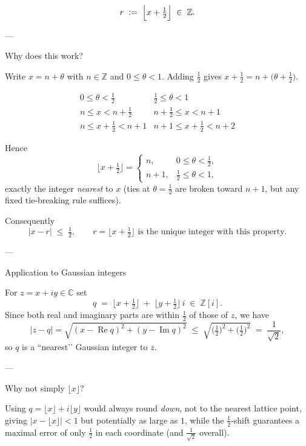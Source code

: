 \documentclass[12pt]{article}
\theoremstyle{definition} %
\theoremstyle{plain} %
\begin{document}
\begin{align}
r \;:=\; \Bigl\lfloor x + \tfrac12 \Bigr\rfloor \;\in\; \mathbb{Z}.
\end{align}

---

 Why does this work?

Write \(x = n + \theta\) with \(n\in\mathbb{Z}\) and \(0 \le \theta < 1\).
Adding \(\tfrac12\) gives  
\(x + \tfrac12 = n + \bigl(\theta + \tfrac12\bigr)\).

\[
\begin{array}{c|c}
0 \le \theta < \tfrac12 & \tfrac12 \le \theta < 1 \\ \hline
n \le x < n+\tfrac12     & n+\tfrac12 \le x < n+1 \\
n \le x+\tfrac12 < n+1   & n+1 \le x+\tfrac12 < n+2
\end{array}
\]

Hence
\[
\lfloor x + \tfrac12 \rfloor
=
\begin{cases}
n,   & 0 \le \theta < \tfrac12,\\[4pt]
n+1, & \tfrac12 \le \theta < 1,
\end{cases}
\]
exactly the integer \emph{nearest} to \(x\) (ties at
\(\theta=\tfrac12\) are broken toward \(n+1\), but any fixed
tie-breaking rule suffices).

Consequently
\[
|x-r|\;\le\;\tfrac12,
\qquad
r = \lfloor x+\tfrac12\rfloor \text{ is the unique integer with this property.}
\]

---

Application to Gaussian integers

For \(z = x + iy \in \mathbb{C}\) set
\[
q \;=\;
\bigl\lfloor x + \tfrac12\bigr\rfloor
\;+\;
\bigl\lfloor y + \tfrac12\bigr\rfloor\,i
\;\in\; \mathbb{Z}[i].
\]
Since both real and imaginary parts are within \(\tfrac12\) of those of
\(z\), we have
\[
|z-q|
=\sqrt{(x-\operatorname{Re}q)^2 + (y-\operatorname{Im}q)^2}
\;\le\;
\sqrt{\bigl(\tfrac12\bigr)^2 + \bigl(\tfrac12\bigr)^2}
\;=\;
\frac1{\sqrt2},
\]
so \(q\) is a “nearest’’ Gaussian integer to \(z\).

---

 Why not simply \(\lfloor x\rfloor\)?

Using \(q = \lfloor x\rfloor + i\lfloor y\rfloor\) would always
round \emph{down}, not to the nearest lattice point, giving
\(|x-\lfloor x\rfloor|<1\) but potentially as large as \(1\),
while the \(\tfrac12\)-shift guarantees a maximal error of only
\(\tfrac12\) in each coordinate (and \(\tfrac1{\sqrt2}\) overall).
\end{document}
